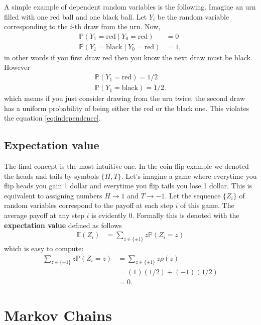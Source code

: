 \documentclass[11pt]{article}
\begin{document}
A simple example of dependent random variables is the following. Imagine an urn
filled with one red ball and one black ball. Let \(Y_{i}\) be the random variable
corresponding to the \(i\)-th draw from the urn. Now,
\begin{align*}
\mathbb{P}(Y_{1} = \text{red} \mid Y_{0} = \text{red}) &= 0 \\
\mathbb{P}(Y_{1} = \text{black} \mid Y_{0} = \text{red}) &= 1,
\end{align*}
in other words if you first draw red then you know the next draw must be black.
However
\begin{align*}
\mathbb{P}(Y_{1} = \text{red}) = 1/2\\
\mathbb{P}(Y_{1} = \text{black}) = 1/2.
\end{align*}
which means if you just consider drawing from the urn twice, the second draw has
a uniform probability of being either the red or the black one. This
violates the equation \eqref{eq:independence}.
\subsection{Expectation value}
\label{sec:org03884d1}
The final concept is the most intuitive one. In the coin flip example we denoted
the heads and tails by symbols \(\{H, T\}\). Let's imagine a game where
everytime you flip heads you gain 1 dollar and everytime you flip tails you lose
1 dollar. This is equivalent to assigning numbers \(H \to 1\) and \(T \to -1\).
Let the sequence \(\{Z_{i}\}\) of random variables correspond to the payoff at
each step \(i\) of this game. The average payoff at any step \(i\) is evidently
\(0\). Formally this is denoted with the \textbf{expectation value} defined as follows
\begin{align*}
\mathbb{E}(Z_{i}) &= \sum_{z \in \{\pm 1\}} z \mathbb{P}(Z_{i} = z)
\end{align*}
which is easy to compute:
\begin{align*}
\sum_{z \in \{\pm 1\}} z \mathbb{P}(Z_{i} = z)
                 &= \sum_{z \in \{\pm 1\}} z \rho(z) \\
                 &= (1)(1/2) + (-1)(1/2) \\
                 &= 0.
\end{align*}
\section{Markov Chains}
\label{sec:orgde6595a}
\end{document}
